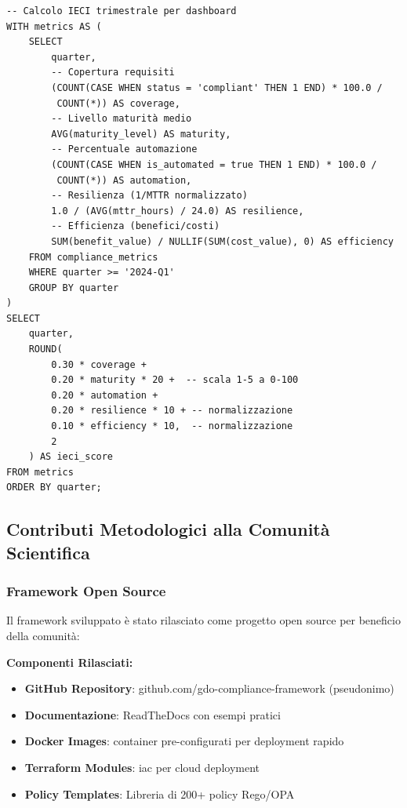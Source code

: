 \begin{lstlisting}[caption={Query SQL per Calcolo IECI},label={lst:ieci_sql}]
-- Calcolo IECI trimestrale per dashboard
WITH metrics AS (
    SELECT 
        quarter,
        -- Copertura requisiti
        (COUNT(CASE WHEN status = 'compliant' THEN 1 END) * 100.0 / 
         COUNT(*)) AS coverage,
        -- Livello maturità medio
        AVG(maturity_level) AS maturity,
        -- Percentuale automazione
        (COUNT(CASE WHEN is_automated = true THEN 1 END) * 100.0 / 
         COUNT(*)) AS automation,
        -- Resilienza (1/MTTR normalizzato)
        1.0 / (AVG(mttr_hours) / 24.0) AS resilience,
        -- Efficienza (benefici/costi)
        SUM(benefit_value) / NULLIF(SUM(cost_value), 0) AS efficiency
    FROM compliance_metrics
    WHERE quarter >= '2024-Q1'
    GROUP BY quarter
)
SELECT 
    quarter,
    ROUND(
        0.30 * coverage + 
        0.20 * maturity * 20 +  -- scala 1-5 a 0-100
        0.20 * automation + 
        0.20 * resilience * 10 + -- normalizzazione
        0.10 * efficiency * 10,  -- normalizzazione
        2
    ) AS ieci_score
FROM metrics
ORDER BY quarter;
\end{lstlisting}

\subsection{Contributi Metodologici alla Comunità Scientifica}

\subsubsection{Framework Open Source}

Il framework sviluppato è stato rilasciato come progetto open source per beneficio della comunità:

\textbf{Componenti Rilasciati:}
\begin{itemize}
    \item \textbf{GitHub Repository}: github.com/gdo-compliance-framework (pseudonimo)
    \item \textbf{Documentazione}: ReadTheDocs con esempi pratici
    \item \textbf{Docker Images}: \gls{container} pre-configurati per deployment rapido
    \item \textbf{Terraform Modules}: \gls{iac} per cloud deployment
    \item \textbf{Policy Templates}: Libreria di 200+ policy Rego/OPA
\end{itemize}

